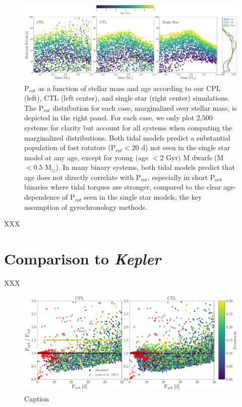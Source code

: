 \documentclass[twocolumn]{aastex61}
\newcommand{\kepler}[0]{\textit{Kepler}\xspace}
\begin{document}
\begin{figure}[t]
	\includegraphics[width=\textwidth]{../Plots/protDist.pdf}
   \caption{P$_{rot}$ as a function of stellar mass and age according to our CPL (left), CTL (left center), and single star (right center) simulations. The P$_{rot}$ distribution for each case, marginalized over stellar mass, is depicted in the right panel. For each case, we only plot 2,500 systems for clarity but account for all systems when computing the marginalized distributions. Both tidal models predict a substantial population of fast rotators (P$_{rot} < 20$ d) not seen in the single star model at any age, except for young (age $< 2$ Gyr) M dwarfs (M$ < 0.5$ M$_{\odot}$). In many binary systems, both tidal models predict that age does not directly correlate with P$_{rot}$, especially in short P$_{orb}$ binaries where tidal torques are stronger, compared to the clear age-dependence of P$_{rot}$ seen in the single star models, the key assumption of gyrochronology methods.}%
    \label{fig:protDist}%
\end{figure}

XXX

\section{Comparison to \kepler} \label{sec:kepler}

XXX

\begin{figure}[t]
	\includegraphics[width=\textwidth]{../Plots/lurieFig7.pdf}
   \caption{Caption}%
    \label{fig:lurie7}%
\end{figure}
\end{document}
